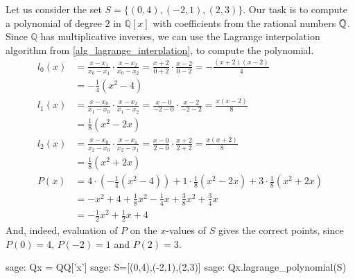 \begin{example} Let us consider the set $S=\{(0,4),(-2,1),(2,3)\}$. Our task is to compute a polynomial of degree $2$ in $\mathbb{Q}[x]$ with coefficients from the rational numbers $\mathbb{Q}$. Since $\mathbb{Q}$ has multiplicative inverses, we can use the Lagrange interpolation algorithm from \ref{alg_lagrange_interplation}, to compute the polynomial. 
\begin{align*}
l_0(x) & = \frac{x-x_1}{x_0-x_1}\cdot\frac{x-x_2}{x_0-x_2}
         = \frac{x+2}{0+2}\cdot\frac{x-2}{0-2}
         =  -\frac{(x+2)(x-2)}{4}\\
       & = -\frac{1}{4}(x^2-4)\\
l_1(x) & = \frac{x-x_0}{x_1-x_0}\cdot\frac{x-x_2}{x_1-x_2}
          = \frac{x-0}{-2-0}\cdot \frac{x-2}{-2-2}
          = \frac{x(x-2)}{8}\\
       & = \frac{1}{8}(x^2-2x)\\
l_2(x) & = \frac{x-x_0}{x_2-x_0}\cdot\frac{x-x_1}{x_2-x_1}
          = \frac{x-0}{2-0}\cdot\frac{x+2}{2+2}
          = \frac{x(x+2)}{8}\\
       & = \frac{1}{8}(x^2+2x)\\
P(x)   & =  4\cdot (-\frac{1}{4}(x^2-4)) + 1\cdot \frac{1}{8}(x^2-2x) + 3\cdot \frac{1}{8}(x^2+2x)\\
       & = -x^2+4 + \frac{1}{8}x^2-\frac{1}{4} x + \frac{3}{8}x^2+\frac{3}{4} x \\
       & = -\frac{1}{2} x^2 +\frac{1}{2} x + 4        
\end{align*}
And, indeed, evaluation of $P$ on the $x$-values of $S$ gives the correct points, since $P(0)=4$, $P(-2)=1$ and $P(2)=3$.
\begin{sagecommandline}
sage: Qx = QQ['x']
sage: S=[(0,4),(-2,1),(2,3)]
sage: Qx.lagrange_polynomial(S)
\end{sagecommandline}
\end{example}
